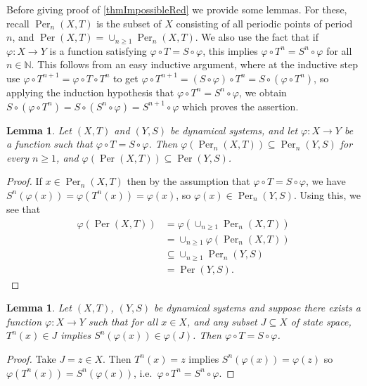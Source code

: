 \documentclass{amsart}
\theoremstyle{theorem}
\newtheorem{lemma}[theorem]{Lemma}
\theoremstyle{remark}
\DeclareMathOperator{\Per}{Per}
\newcommand{\NN}{\mathbb{N}}
\begin{document}
Before giving proof of \cref{thmImpossibleRed} we provide some lemmas.
For these, recall $\Per_n(X, T)$ is the subset of $X$ consisting of all periodic points of period $n$, and $\Per(X, T) = \cup_{n\geq 1} \Per_n(X, T)$. We also use the fact that if $\varphi:X \rightarrow Y$ is a function satisfying $\varphi\circ T = S \circ \varphi$, this implies $\varphi\circ T^n = S^n \circ \varphi$ for all $n \in \NN$. This follows from an easy inductive argument, where at the inductive step use $\varphi\circ T^{n+1} = \varphi \circ T \circ T^n$ to get $\varphi \circ T^{n+1} = (S \circ \varphi) \circ T^n = S \circ (\varphi \circ T^n)$, so applying the induction hypothesis that $\varphi \circ T^n = S^n \circ \varphi$, we obtain $S \circ (\varphi \circ T^n) = S \circ (S^n \circ \varphi) = S^{n+1} \circ \varphi$ which proves the assertion.

\begin{lemma}\label{lemSemiConjPer}
Let $(X, T)$ and $(Y,S)$ be dynamical systems, and let $\varphi:X\rightarrow Y$ be a function such that $\varphi\circ T = S \circ \varphi$. Then $\varphi(\Per_n(X, T)) \subseteq \Per_n(Y,S)$ for every $n \geq 1$, and $\varphi(\Per(X, T)) \subseteq \Per(Y, S)$.
\end{lemma}
\begin{proof}
If $x \in \Per_n(X, T)$ then by the assumption that $\varphi\circ T = S \circ \varphi$, we have $S^n(\varphi(x)) = \varphi(T^n(x)) = \varphi(x)$, so $\varphi(x) \in \Per_n(Y,S)$. Using this, we see that
\begin{align*}
\varphi(\Per(X, T)) &= \varphi(\cup_{n\geq 1} \Per_n(X, T))\\
&= \cup_{n \geq 1}\varphi(\Per_n(X, T)) \\
&\subseteq \cup_{n\geq 1}\Per_n(Y,S)\\
&= \Per(Y,S).
\end{align*}
\end{proof}

\begin{lemma}\label{lemConjEquiv}
Let $(X, T)$, $(Y, S)$ be dynamical systems and suppose there exists a function $\varphi:X\rightarrow Y$ such that for all $x \in X$, and any subset $J \subseteq X$ of state space, $T^n(x) \in J$ implies $S^n(\varphi(x)) \in \varphi(J)$. Then $\varphi\circ T = S \circ \varphi$.
\end{lemma}
\begin{proof}
Take $J = z\in X$. Then $T^n(x) = z$ implies $S^n(\varphi(x)) = \varphi(z)$ so $\varphi(T^n(x)) = S^n(\varphi(x))$, i.e.\ $\varphi\circ T^n = S^n \circ \varphi$.
\end{proof}
\end{document}

